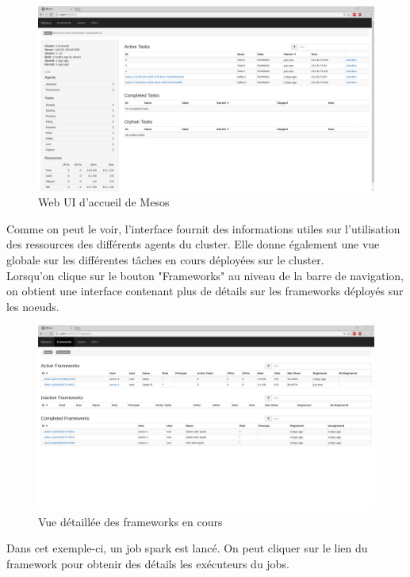 \documentclass[a4paper, 11pt, titlepage]{article}
\begin{document}
\begin{figure}[H]
    \centering
    \centerline{\includegraphics[scale=0.23]{res/mesos.png}}
    \caption{Web UI d'accueil de Mesos}
\end{figure}
Comme on peut le voir, l'interface fournit des informations utiles sur l'utilisation des ressources des différents agents du cluster. Elle donne également une vue globale sur les différentes tâches en cours déployées sur le cluster. \\Lorsqu'on clique sur le bouton "Frameworks" au niveau de la barre de navigation, on obtient une interface contenant plus de détails sur les frameworks déployés sur les noeuds.
\begin{figure}[H]
    \centering
    \centerline{\includegraphics[scale=0.23]{res/fra.png}}
    \caption{Vue détaillée des frameworks en cours}
\end{figure}
Dans cet exemple-ci, un job spark est lancé. On peut cliquer sur le lien du framework pour obtenir des détails les exécuteurs du jobs.\\
\end{document}
